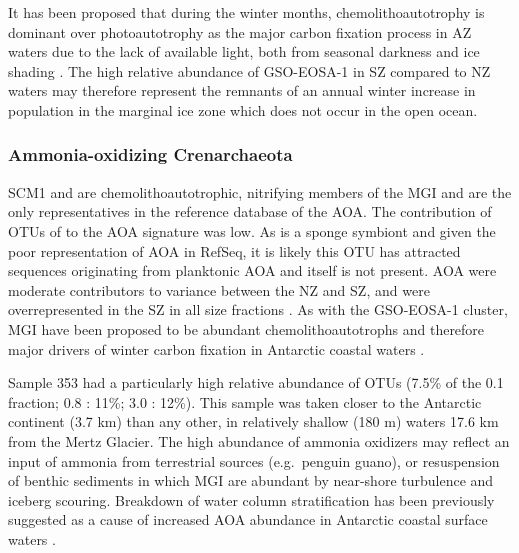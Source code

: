It has been proposed that during the winter months, chemolithoautotrophy is dominant over photoautotrophy as the major carbon fixation process in \ac{AZ} waters due to the lack of available light, both from seasonal darkness and ice shading \cite{Grzymski:2012ej}.
The high relative abundance of GSO-EOSA-1 in \ac{SZ} compared to \ac{NZ} waters may therefore represent the remnants of an annual winter increase in population in the marginal ice zone which does not occur in the open ocean.

\subsubsection{Ammonia-oxidizing Crenarchaeota}

 SCM1 and  are chemolithoautotrophic, nitrifying members of the \ac{MGI} \cite{Preston:1996vi,Walker:2010ww} and are the only representatives in the reference database of the \ac{AOA}.
The contribution of \acp{OTU} of  to the \ac{AOA} signature was low.
As  is a sponge symbiont \cite{Preston:1996vi} and given the poor representation of \ac{AOA} in RefSeq, it is likely this \ac{OTU} has attracted sequences originating from planktonic \ac{AOA} and  itself is not present.
\ac{AOA} were moderate contributors to variance between the \ac{NZ} and \ac{SZ}, and were overrepresented in the \ac{SZ} in all size fractions .
As with the GSO-EOSA-1 cluster, \ac{MGI} have been proposed to be abundant chemolithoautotrophs and therefore major drivers of winter carbon fixation in Antarctic coastal waters \cite{Grzymski:2012ej,Williams:2012bs}.

Sample 353 had a particularly high relative abundance of  \acp{OTU} (7.5\% of the 0.1 \micron{} fraction; 0.8 \micron: 11\%; 3.0 \micron: 12\%).
This sample was taken closer to the Antarctic continent (3.7 km) than any other, in relatively shallow (180 m) waters 17.6 km from the Mertz Glacier.
The high abundance of ammonia oxidizers may reflect an input of ammonia from terrestrial sources (e.g.\ penguin guano), or resuspension of benthic sediments in which \ac{MGI} are abundant \cite{Bowman:2003fa} by near-shore turbulence and iceberg scouring.
Breakdown of water column stratification has been previously suggested as a cause of increased \ac{AOA} abundance in Antarctic coastal surface waters \cite{Kalanetra:2009bv}.

